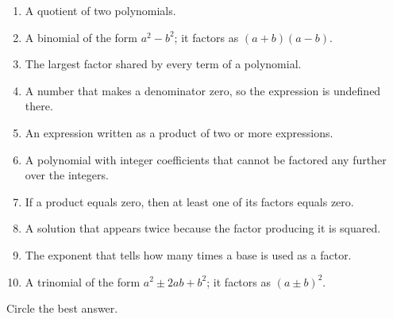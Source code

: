 \vspace{6pt}
\begin{enumerate}[label=(\Alph*), leftmargin=2.4em, itemsep=1pt, topsep=2pt, font=\bfseries]
  \small
  \item A quotient of two polynomials.
  \item A binomial of the form $a^2-b^2$; it factors as $(a+b)(a-b)$.
  \item The largest factor shared by every term of a polynomial.
  \item A number that makes a denominator zero, so the expression is undefined there.
  \item An expression written as a product of two or more expressions.
  \item A polynomial with integer coefficients that cannot be factored any further over the integers.
  \item If a product equals zero, then at least one of its factors equals zero.
  \item A solution that appears twice because the factor producing it is squared.
  \item The exponent that tells how many times a base is used as a factor.
  \item A trinomial of the form $a^2 \pm 2ab + b^2$; it factors as $(a \pm b)^2$.
\end{enumerate}


\noindent\small Circle the best answer.

